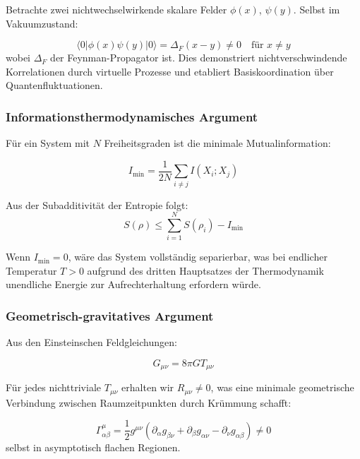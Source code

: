 \documentclass[11pt,a4paper]{article}
\begin{document}
	Betrachte zwei nichtwechselwirkende skalare Felder $\phi(x)$, $\psi(y)$. Selbst im Vakuumzustand:
	
	\begin{equation}
		\langle 0 | \phi(x) \psi(y) | 0 \rangle = \Delta_F(x-y) \neq 0 \quad \text{für } x \neq y
	\end{equation}
	wobei $\Delta_F$ der Feynman-Propagator ist. Dies demonstriert nichtverschwindende Korrelationen durch virtuelle Prozesse und etabliert Basiskoordination über Quantenfluktuationen.
	
	\subsubsection{Informationsthermodynamisches Argument}
	
	Für ein System mit $N$ Freiheitsgraden ist die minimale Mutualinformation:
	
	\begin{equation}
		I_{\min} = \frac{1}{2N} \sum_{i \neq j} I(X_i; X_j)
	\end{equation}
	
	Aus der Subadditivität der Entropie folgt:
	\begin{equation}
		S(\rho) \leq \sum_{i=1}^N S(\rho_i) - I_{\min}
	\end{equation}
	
	Wenn $I_{\min} = 0$, wäre das System vollständig separierbar, was bei endlicher Temperatur $T > 0$ aufgrund des dritten Hauptsatzes der Thermodynamik unendliche Energie zur Aufrechterhaltung erfordern würde.
	
	\subsubsection{Geometrisch-gravitatives Argument}
	
	Aus den Einsteinschen Feldgleichungen:
	
	\begin{equation}
		G_{\mu\nu} = 8\pi G T_{\mu\nu}
	\end{equation}
	
	Für jedes nichttriviale $T_{\mu\nu}$ erhalten wir $R_{\mu\nu} \neq 0$, was eine minimale geometrische Verbindung zwischen Raumzeitpunkten durch Krümmung schafft:
	
	\begin{equation}
		\Gamma^\mu_{\alpha\beta} = \frac{1}{2} g^{\mu\nu}(\partial_\alpha g_{\beta\nu} + \partial_\beta g_{\alpha\nu} - \partial_\nu g_{\alpha\beta}) \neq 0
	\end{equation}
	selbst in asymptotisch flachen Regionen.
	
\end{document}
